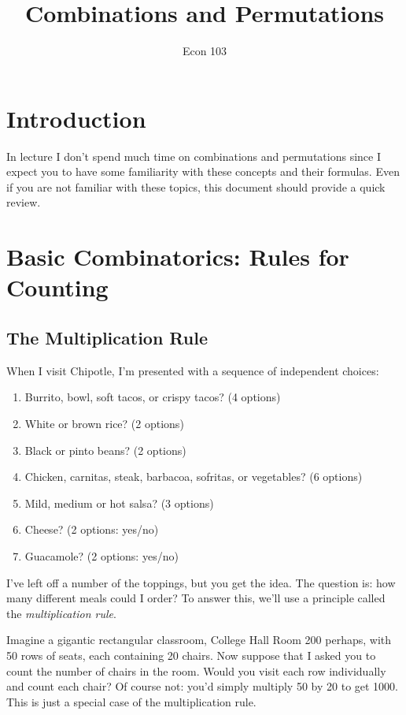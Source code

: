 \documentclass[12pt]{article}
\title{Combinations and Permutations}
\author{Econ 103}
\date{}
\begin{document}
\maketitle

\section*{Introduction}
In lecture I don't spend much time on combinations and permutations since I expect you to have some familiarity with these concepts and their formulas. Even if you are not familiar with these topics, this document should provide a quick review.

\section*{Basic Combinatorics: Rules for Counting}
\subsection*{The Multiplication Rule}
When I visit Chipotle, I'm presented with a sequence of independent choices:
\begin{enumerate}
    \item Burrito, bowl, soft tacos, or crispy tacos? (4 options)
    \item White or brown rice? (2 options)
    \item Black or pinto beans? (2 options)
    \item Chicken, carnitas, steak, barbacoa, sofritas, or vegetables? (6 options) 
    \item Mild, medium or hot salsa? (3 options)
    \item Cheese? (2 options: yes/no)
    \item Guacamole? (2 options: yes/no)
\end{enumerate}

I've left off a number of the toppings, but you get the idea.
The question is: how many different meals could I order?
To answer this, we'll use a principle called the \emph{multiplication rule}.

Imagine a gigantic rectangular classroom, College Hall Room 200 perhaps, with 50 rows of seats, each containing 20 chairs. Now suppose that I asked you to count the number of chairs in the room. Would you visit each row individually and count each chair? Of course not: you'd simply multiply 50 by 20 to get 1000. This is just a special case of the multiplication rule.
\end{document}
